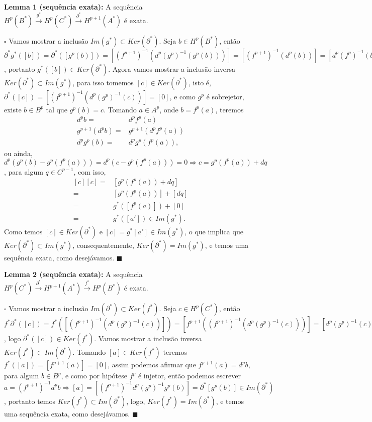 \documentclass{article}
\begin{document}
	\textbf{Lemma 1 (sequência exata):} A sequência $H^{p}(B^{*}) \xrightarrow{g^{*}} H^{p}(C^{*}) \xrightarrow{\partial^{*}} H^{p+1}(A^{*})$ é exata.
	
	$\square$ Vamos mostrar a inclusão $Im(g^{*}) \subset Ker(\partial^{*})$. Seja $b \in H^{p}(B^{*})$, então $\partial^{*}g^{*}([b]) = \partial^{*}([g^{p}(b)]) = [(f^{p+1})^{-1}(d^{p}(g^{p})^{-1}(g^{p}(b)))] = [(f^{p+1})^{-1}(d^{p}(b))] = [d^{p}(f^{p})^{-1}(b)] = [0]$, portanto $g^{*}([b]) \in Ker(\partial^{*})$. Agora vamos mostrar a inclusão inversa $Ker(\partial^{*}) \subset Im(g^{*})$, para isso tomemos $[c] \in Ker(\partial^{*})$, isto é, $\partial^{*}([c]) = [(f^{p+1})^{-1}(d^{p}(g^{p})^{-1}(c))] = [0]$, e como $g^{p}$ é sobrejetor, existe $b \in B^{p}$ tal que $g^{p}(b) = c$. Tomando $a \in A^{p}$, onde $b = f^{p}(a)$, teremos 
	$$
	\begin{aligned}
	d^{p}b =& d^{p}f^{p}(a)
	\\
	g^{p+1}(d^{p}b) =&  g^{p+1}(d^{p}f^{p}(a)) 
	\\
	d^{p}g^{p}(b) =& d^{p}g^{p}(f^{p}(a)),
	\end{aligned}
	$$
	ou ainda, $d^{p}(g^{p}(b) - g^{p}(f^{p}(a)))=d^{p}(c - g^{p}(f^{p}(a)))=0 \Rightarrow c = g^{p}(f^{p}(a)) + dq$, para algum $q \in C^{p-1}$, com isso, 
	$$
	\begin{aligned}
	[c][c] =& [g^{p}(f^{p}(a)) + dq] 
	\\
	=& [g^{p}(f^{p}(a))] + [dq] 
	\\
	=& g^{*}([f^{p}(a)]) +[0] 
	\\
	=& g^{*}([a']) \in  Im(g^{*}).
	\end{aligned}
	$$
	Como temos $[c] \in Ker(\partial^{*})$ e $[c] = g^{*}[a'] \in Im(g^{*})$, o que implica que $Ker(\partial^{*}) \subset Im(g^{*})$, consequentemente, $Ker(\partial^{*}) = Im(g^{*})$, e temos uma sequência exata, como desejávamos. $\blacksquare$
	
	\textbf{Lemma 2 (sequência exata):} A sequência $H^{p}(C^{*}) \xrightarrow{\partial^{*}} H^{p+1}(A^{*}) \xrightarrow{f^{*}}  H^{p}(B^{*})$ é exata.
	
	$\square$ Vamos mostrar a inclusão  $Im(\partial^{*}) \subset Ker(f^{*})$. Seja $c \in H^{p}(C^{*})$, então $f^{*}\partial^{*}([c]) = f^{*}([(f^{p+1})^{-1}(d^{p}(g^{p})^{-1}(c))]) = [f^{p+1}((f^{p+1})^{-1}(d^{p}(g^{p})^{-1}(c)))] = [d^{p}(g^{p})^{-1}(c)] = [0]$, logo $\partial^{*}([c]) \in Ker(f^{*})$. Vamos mostrar a inclusão inversa $Ker(f^{*}) \subset Im(\partial^{*}) $. Tomando $[a] \in Ker(f^{*})$ teremos $f^{*}([a]) = [f^{p+1}(a)] = [0]$, assim podemos afirmar que $f^{p+1}(a) = d^{p}b$, para algum $b \in B^{p}$, e como por hipótese $f^{p}$ é injetor, então podemos escrever $a = (f^{p+1})^{-1}d^{p}b \Rightarrow [a] = [(f^{p+1})^{-1}d^{p}(g^{p})^{-1}g^{p}(b)] = \partial^{*}[g^{p}(b)] \in Im(\partial^{*})$, portanto temos $Ker(f^{*}) \subset Im(\partial^{*})$, logo, $Ker(f^{*}) = Im(\partial^{*})$, e temos uma sequência exata, como desejávamos. $\blacksquare$
	
\end{document}
